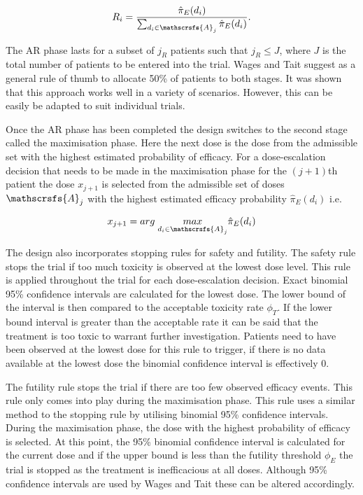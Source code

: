 \begin{equation}
	\label{WT:eq_WT-ARprob}
	R_i = \frac{\hat{\pi}_E(d_i)}{\sum_{d_i \in \mathscrsfs{A}_j}\hat{\pi}_E(d_i)}. 
\end{equation}

The AR phase lasts for a subset of $j_R$ patients such that $j_R \leq J$, where $J$ is the total number of patients to be entered into the trial. Wages and Tait suggest as a general rule of thumb to allocate 50\% of patients to both stages. It was shown that this approach works well in a variety of scenarios. However, this can be easily be adapted to suit individual trials. 

Once the AR phase has been completed the design switches to the second stage called the maximisation phase. Here the next dose is the dose from the admissible set with the highest estimated probability of efficacy. For a dose-escalation decision that needs to be made in the maximisation phase for the $(j+1)$th patient the dose $x_{j+1}$ is selected from the admissible set of doses $\mathscrsfs{A}_j$ with the highest estimated efficacy probability $\hat{\pi}_E(d_i)$ i.e. 

\begin{equation}
	x_{j+1} = arg \; \underset{d_i \in \mathscrsfs{A}_j}{max}\hat{\pi}_E(d_i)
\end{equation}

The design also incorporates stopping rules for safety and futility. The safety rule stops the trial if too much toxicity is observed at the lowest dose level. This rule is applied throughout the trial for each dose-escalation decision. Exact binomial 95\% confidence intervals are calculated for the lowest dose. The lower bound of the interval is then compared to the acceptable toxicity rate $\phi_T$. If the lower bound interval is greater than the acceptable rate it can be said that the treatment is too toxic to warrant further investigation. Patients need to have been observed at the lowest dose for this rule to trigger, if there is no data available at the lowest dose the binomial confidence interval is effectively 0. 

The futility rule stops the trial if there are too few observed efficacy events. This rule only comes into play during the maximisation phase. This rule uses a similar method to the stopping rule by utilising binomial 95\% confidence intervals. During the maximisation phase, the dose with the highest probability of efficacy is selected. At this point, the 95\% binomial confidence interval is calculated for the current dose and if the upper bound is less than the futility threshold $\phi_E$ the trial is stopped as the treatment is inefficacious at all doses. Although 95\% confidence intervals are used by Wages and Tait these can be altered accordingly. 


